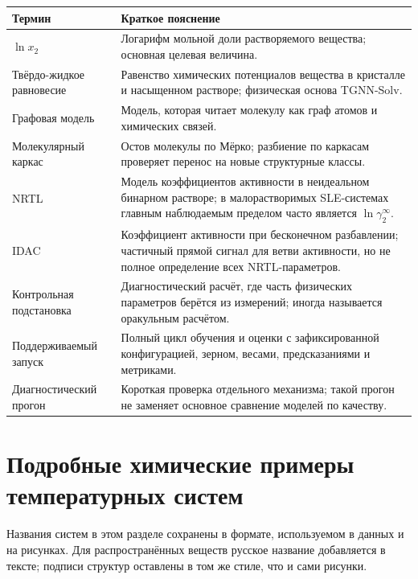 \documentclass[11pt]{article}
\theoremstyle{definition}
\begin{document}
\begin{center}
\begin{tabularx}{\textwidth}{P{0.24\textwidth}Y}
\toprule
Термин & Краткое пояснение \\
\midrule
$\ln x_2$ & Логарифм мольной доли растворяемого вещества; основная целевая величина. \\
Твёрдо-жидкое равновесие & Равенство химических потенциалов вещества в кристалле и насыщенном растворе; физическая основа TGNN-Solv. \\
Графовая модель & Модель, которая читает молекулу как граф атомов и химических связей. \\
Молекулярный каркас & Остов молекулы по Мёрко; разбиение по каркасам проверяет перенос на новые структурные классы. \\
NRTL & Модель коэффициентов активности в неидеальном бинарном растворе; в малорастворимых SLE-системах главным наблюдаемым пределом часто является $\ln\gamma_2^\infty$. \\
IDAC & Коэффициент активности при бесконечном разбавлении; частичный прямой сигнал для ветви активности, но не полное определение всех NRTL-параметров. \\
Контрольная подстановка & Диагностический расчёт, где часть физических параметров берётся из измерений; иногда называется оракульным расчётом. \\
Поддерживаемый запуск & Полный цикл обучения и оценки с зафиксированной конфигурацией, зерном, весами, предсказаниями и метриками. \\
Диагностический прогон & Короткая проверка отдельного механизма; такой прогон не заменяет основное сравнение моделей по качеству. \\
\bottomrule
\end{tabularx}
\end{center}

\section{Подробные химические примеры температурных систем}\label{app:detailed-cases}

Названия систем в этом разделе сохранены в формате, используемом в данных и на рисунках. Для распространённых веществ русское название добавляется в тексте; подписи структур оставлены в том же стиле, что и сами рисунки.
\end{document}
